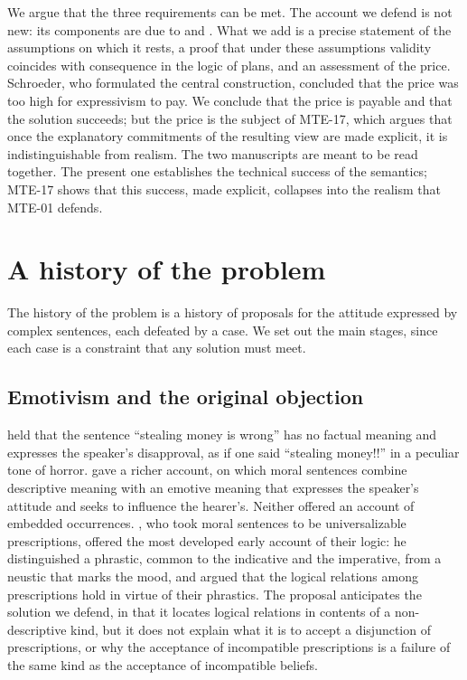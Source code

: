 \documentclass{situationist-preprint}
\begin{document}
We argue that the three requirements can be met. The account we defend is not new: its components are due to \citet{Gibbard1990,Gibbard2003} and \citet{Schroeder2008book,Schroeder2008nous}. What we add is a precise statement of the assumptions on which it rests, a proof that under these assumptions validity coincides with consequence in the logic of plans, and an assessment of the price. Schroeder, who formulated the central construction, concluded that the price was too high for expressivism to pay. We conclude that the price is payable and that the solution succeeds; but the price is the subject of MTE-17, which argues that once the explanatory commitments of the resulting view are made explicit, it is indistinguishable from realism. The two manuscripts are meant to be read together. The present one establishes the technical success of the semantics; MTE-17 shows that this success, made explicit, collapses into the realism that MTE-01 defends.

\section{A history of the problem}

The history of the problem is a history of proposals for the attitude expressed by complex sentences, each defeated by a case. We set out the main stages, since each case is a constraint that any solution must meet.

\subsection{Emotivism and the original objection}

\citet{Ayer1936} held that the sentence \enquote{stealing money is wrong} has no factual meaning and expresses the speaker's disapproval, as if one said \enquote{stealing money!!} in a peculiar tone of horror. \citet{Stevenson1944} gave a richer account, on which moral sentences combine descriptive meaning with an emotive meaning that expresses the speaker's attitude and seeks to influence the hearer's. Neither offered an account of embedded occurrences. \citet{Hare1952}, who took moral sentences to be universalizable prescriptions, offered the most developed early account of their logic: he distinguished a phrastic, common to the indicative and the imperative, from a neustic that marks the mood, and argued that the logical relations among prescriptions hold in virtue of their phrastics. The proposal anticipates the solution we defend, in that it locates logical relations in contents of a non-descriptive kind, but it does not explain what it is to accept a disjunction of prescriptions, or why the acceptance of incompatible prescriptions is a failure of the same kind as the acceptance of incompatible beliefs.
\end{document}
